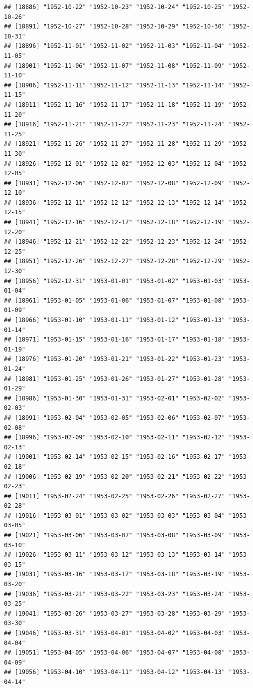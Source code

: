 \documentclass{article}\usepackage[]{graphicx}\usepackage[]{color}
\makeatletter
\newenvironment{kframe}{%
 \def\at@end@of@kframe{}%
 \ifinner\ifhmode%
  \def\at@end@of@kframe{\end{minipage}}%
  \begin{minipage}{\columnwidth}%
 \fi\fi%
 \def\FrameCommand##1{\hskip\@totalleftmargin \hskip-\fboxsep
 \colorbox{shadecolor}{##1}\hskip-\fboxsep
     \hskip-\linewidth \hskip-\@totalleftmargin \hskip\columnwidth}%
 \MakeFramed {\advance\hsize-\width
   \@totalleftmargin\z@ \linewidth\hsize
   \@setminipage}}%
 {\par\unskip\endMakeFramed%
 \at@end@of@kframe}
\newenvironment{knitrout}{}{} %
\makeatother
\begin{document}
\begin{description}
\begin{knitrout}
\begin{kframe}
\begin{verbatim}
## [18886] "1952-10-22" "1952-10-23" "1952-10-24" "1952-10-25" "1952-10-26"
## [18891] "1952-10-27" "1952-10-28" "1952-10-29" "1952-10-30" "1952-10-31"
## [18896] "1952-11-01" "1952-11-02" "1952-11-03" "1952-11-04" "1952-11-05"
## [18901] "1952-11-06" "1952-11-07" "1952-11-08" "1952-11-09" "1952-11-10"
## [18906] "1952-11-11" "1952-11-12" "1952-11-13" "1952-11-14" "1952-11-15"
## [18911] "1952-11-16" "1952-11-17" "1952-11-18" "1952-11-19" "1952-11-20"
## [18916] "1952-11-21" "1952-11-22" "1952-11-23" "1952-11-24" "1952-11-25"
## [18921] "1952-11-26" "1952-11-27" "1952-11-28" "1952-11-29" "1952-11-30"
## [18926] "1952-12-01" "1952-12-02" "1952-12-03" "1952-12-04" "1952-12-05"
## [18931] "1952-12-06" "1952-12-07" "1952-12-08" "1952-12-09" "1952-12-10"
## [18936] "1952-12-11" "1952-12-12" "1952-12-13" "1952-12-14" "1952-12-15"
## [18941] "1952-12-16" "1952-12-17" "1952-12-18" "1952-12-19" "1952-12-20"
## [18946] "1952-12-21" "1952-12-22" "1952-12-23" "1952-12-24" "1952-12-25"
## [18951] "1952-12-26" "1952-12-27" "1952-12-28" "1952-12-29" "1952-12-30"
## [18956] "1952-12-31" "1953-01-01" "1953-01-02" "1953-01-03" "1953-01-04"
## [18961] "1953-01-05" "1953-01-06" "1953-01-07" "1953-01-08" "1953-01-09"
## [18966] "1953-01-10" "1953-01-11" "1953-01-12" "1953-01-13" "1953-01-14"
## [18971] "1953-01-15" "1953-01-16" "1953-01-17" "1953-01-18" "1953-01-19"
## [18976] "1953-01-20" "1953-01-21" "1953-01-22" "1953-01-23" "1953-01-24"
## [18981] "1953-01-25" "1953-01-26" "1953-01-27" "1953-01-28" "1953-01-29"
## [18986] "1953-01-30" "1953-01-31" "1953-02-01" "1953-02-02" "1953-02-03"
## [18991] "1953-02-04" "1953-02-05" "1953-02-06" "1953-02-07" "1953-02-08"
## [18996] "1953-02-09" "1953-02-10" "1953-02-11" "1953-02-12" "1953-02-13"
## [19001] "1953-02-14" "1953-02-15" "1953-02-16" "1953-02-17" "1953-02-18"
## [19006] "1953-02-19" "1953-02-20" "1953-02-21" "1953-02-22" "1953-02-23"
## [19011] "1953-02-24" "1953-02-25" "1953-02-26" "1953-02-27" "1953-02-28"
## [19016] "1953-03-01" "1953-03-02" "1953-03-03" "1953-03-04" "1953-03-05"
## [19021] "1953-03-06" "1953-03-07" "1953-03-08" "1953-03-09" "1953-03-10"
## [19026] "1953-03-11" "1953-03-12" "1953-03-13" "1953-03-14" "1953-03-15"
## [19031] "1953-03-16" "1953-03-17" "1953-03-18" "1953-03-19" "1953-03-20"
## [19036] "1953-03-21" "1953-03-22" "1953-03-23" "1953-03-24" "1953-03-25"
## [19041] "1953-03-26" "1953-03-27" "1953-03-28" "1953-03-29" "1953-03-30"
## [19046] "1953-03-31" "1953-04-01" "1953-04-02" "1953-04-03" "1953-04-04"
## [19051] "1953-04-05" "1953-04-06" "1953-04-07" "1953-04-08" "1953-04-09"
## [19056] "1953-04-10" "1953-04-11" "1953-04-12" "1953-04-13" "1953-04-14"

\end{verbatim}
\end{kframe}
\end{knitrout}
\end{description}
\end{document}
